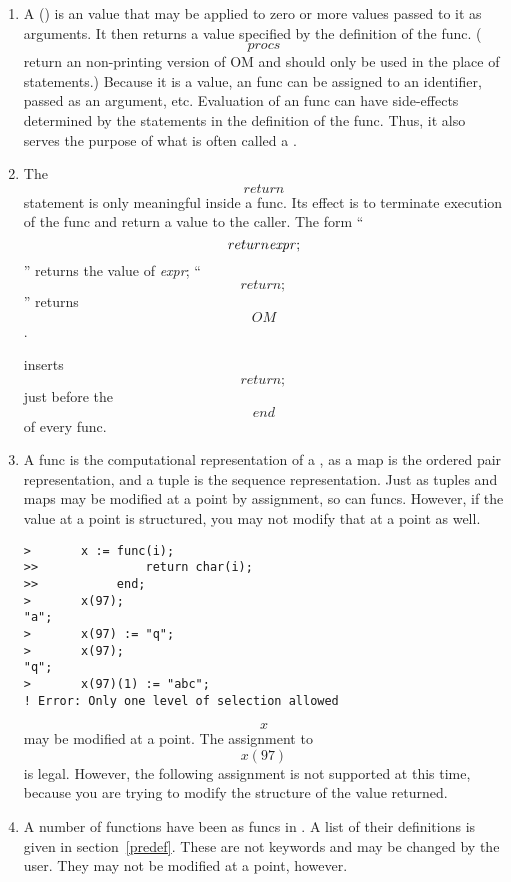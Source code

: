     \begin{enumerate}
    \item
    A  () is an \ISETL{} value that may be applied 
    to zero or more values passed to it as arguments.
    It then returns a value specified by the
    definition of the func. (\[procs\] return an non-printing version
    of OM and should only be used in the place of statements.)
    Because it is a value, an \ISETL{} func can
    be assigned to an identifier, passed as an argument, etc.
    Evaluation of an \ISETL{} func can have side-effects determined by the
    statements in the definition of the func.
    Thus, it also serves the purpose of what is often called a 
    .

    \item
    The \[return\] statement is only meaningful inside a func.
    Its effect is to terminate execution of
    the func and return a value to the caller.
    The form ``\[return {\it expr};\]'' returns the value of {\it expr};
    ``\[return;\]'' returns \[OM\].

    \ISETL{} inserts \[return;\] just before the \[end\] of every func.


    \item
    A func is the computational 
    representation of a , as a map
    is the ordered pair representation, and a tuple is the sequence
    representation.
    Just as tuples and maps may be modified at a point 
    by assignment, so can funcs.
    However, if the value at a point is structured, you may not modify
    that at a point as well.

\begin{indented}
\begin{verbatim}
>       x := func(i);
>>               return char(i);
>>           end;
>       x(97);
"a";
>       x(97) := "q"; 
>       x(97);
"q";
>       x(97)(1) := "abc";
! Error: Only one level of selection allowed
\end{verbatim}
\end{indented}

     \[x\] may be modified at a point.
     The assignment to \[x(97)\] is legal.
     However, the following assignment is not supported at this time,
     because you are trying to modify the structure of the value
     returned.

    \item
    A number of functions have been 
    as funcs in \ISETL{}\@.
    A list of their definitions is given in section~\ref{predef}.
    These are not keywords and may be changed by the user.
    They may not be modified at a point, however.


\end{enumerate}
